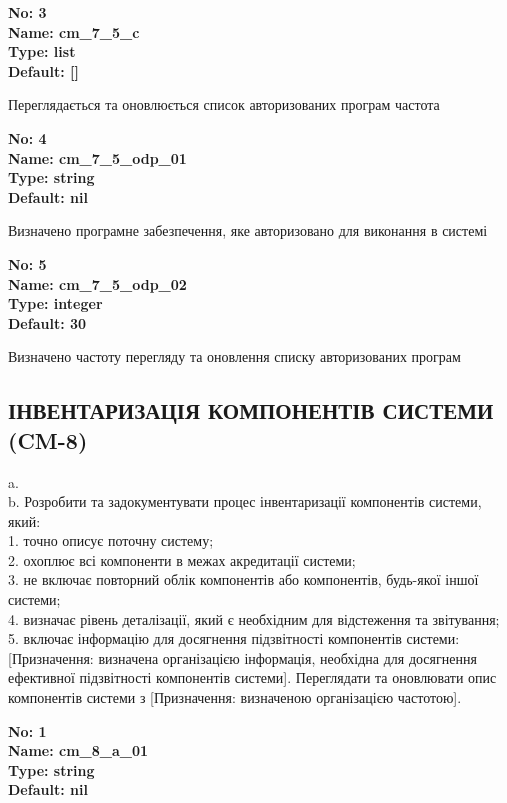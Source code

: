 \documentclass{article}
\begin{document}
{\footnotesize\bfseries
No: 3\\
Name: cm\_\allowbreak{}7\_\allowbreak{}5\_\allowbreak{}c\\
Type: list\\
Default: []
}

{\footnotesize Переглядається та оновлюється список авторизованих програм частота}


{\footnotesize\bfseries
No: 4\\
Name: cm\_\allowbreak{}7\_\allowbreak{}5\_\allowbreak{}odp\_\allowbreak{}01\\
Type: string\\
Default: nil
}

{\footnotesize Визначено програмне забезпечення, яке авторизовано для виконання в системі}


{\footnotesize\bfseries
No: 5\\
Name: cm\_\allowbreak{}7\_\allowbreak{}5\_\allowbreak{}odp\_\allowbreak{}02\\
Type: integer\\
Default: 30
}

{\footnotesize Визначено частоту перегляду та оновлення списку авторизованих програм}




\subsection{ІНВЕНТАРИЗАЦІЯ КОМПОНЕНТІВ СИСТЕМИ (CM-8)}
a.\\ 
b. Розробити та задокументувати процес інвентаризації компонентів системи, який:\\ 
1. точно описує поточну систему;\\ 
2. охоплює всі компоненти в межах акредитації системи;\\ 
3. не включає повторний облік компонентів або компонентів, будь-якої іншої системи;\\ 
4. визначає рівень деталізації, який є необхідним для відстеження та звітування;\\ 
5. включає інформацію для досягнення підзвітності компонентів системи: [Призначення: визначена організацією інформація, необхідна для досягнення ефективної підзвітності компонентів системи]. Переглядати та оновлювати опис компонентів системи з [Призначення: визначеною організацією частотою].

\vspace{10pt}
{\footnotesize\bfseries
No: 1\\
Name: cm\_\allowbreak{}8\_\allowbreak{}a\_\allowbreak{}01\\
Type: string\\
Default: nil
}
\end{document}
